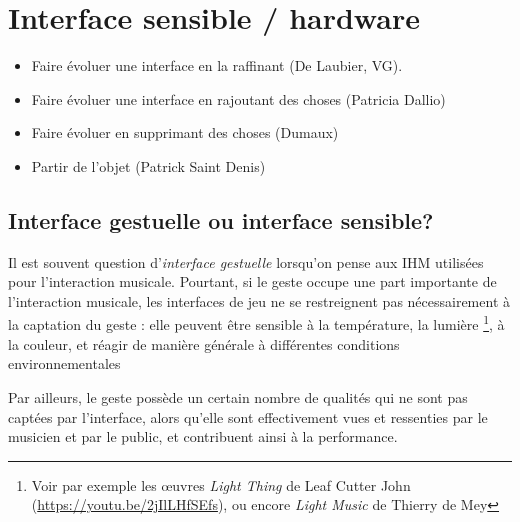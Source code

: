 %
\chapter{Interface sensible / hardware}
\label{ch:interfaces}




\vspace{-1em}
\begin{itemize}[noitemsep]
\item Faire évoluer une interface en la raffinant (De Laubier, VG).
\item Faire évoluer une interface en rajoutant des choses (Patricia Dallio)
\item Faire évoluer en supprimant des choses (Dumaux)
\item Partir de l'objet (Patrick Saint Denis)
\end{itemize}

\section{Interface gestuelle ou interface sensible?}
Il est souvent question d'\textit{interface gestuelle} lorsqu'on pense aux IHM utilisées pour l'interaction musicale. Pourtant, si le geste occupe une part importante de l'interaction musicale, les interfaces de jeu ne se restreignent pas nécessairement à la captation du geste : elle peuvent être sensible à la température, la lumière \footnote{Voir par exemple les œuvres \textit{Light Thing} de Leaf Cutter John (\url{https://youtu.be/2jIlLHfSEfs}), ou encore \textit{Light Music} de Thierry de Mey}, à la couleur, et réagir de manière générale à différentes conditions environnementales 

Par ailleurs, le geste possède un certain nombre de qualités qui ne sont pas captées par l'interface, alors qu'elle sont effectivement vues et ressenties par le musicien et par le public, et contribuent ainsi à la performance.

